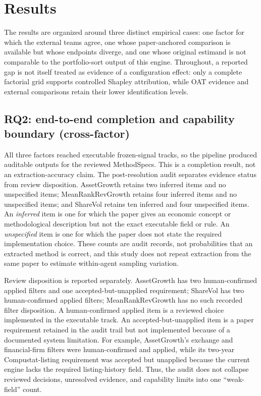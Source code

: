 \section{Results}
\label{sec:results}

The results are organized around three distinct empirical cases: one factor
for which the external teams agree, one whose paper-anchored comparison is
available but whose endpoints diverge, and one whose original estimand is not
comparable to the portfolio-sort output of this engine. Throughout, a reported
gap is not itself treated as evidence of a configuration effect: only a
complete factorial grid supports controlled Shapley attribution, while OAT
evidence and external comparisons retain their lower identification levels.

\subsection{RQ2: end-to-end completion and capability boundary (cross-factor)}

All three factors reached executable frozen-signal tracks, so the pipeline
produced auditable outputs for the reviewed MethodSpecs. This is a completion
result, not an extraction-accuracy claim. The post-resolution audit separates
evidence status from review disposition. AssetGrowth retains two inferred
items and no unspecified items; MeanRankRevGrowth retains four inferred items
and no unspecified items; and ShareVol retains ten inferred and four
unspecified items. An \emph{inferred} item is one for which the paper gives
an economic concept or methodological description but not the exact
executable field or rule. An \emph{unspecified} item is one for which the
paper does not state the required implementation choice. These counts are
audit records, not probabilities that an extracted method is correct, and this
study does not repeat extraction from the same paper to estimate within-agent
sampling variation.

Review disposition is reported separately. AssetGrowth has two
human-confirmed applied filters and one accepted-but-unapplied requirement;
ShareVol has two human-confirmed applied filters; MeanRankRevGrowth has no
such recorded filter disposition. A human-confirmed applied item is a
reviewed choice implemented in the executable track. An accepted-but-unapplied
item is a paper requirement retained in the audit trail but not implemented
because of a documented system limitation. For example, AssetGrowth's exchange
and financial-firm filters were human-confirmed and applied, while its
two-year Compustat-listing requirement was accepted but unapplied because the
current engine lacks the required listing-history field. Thus, the audit does
not collapse reviewed decisions, unresolved evidence, and capability limits
into one ``weak-field'' count.

